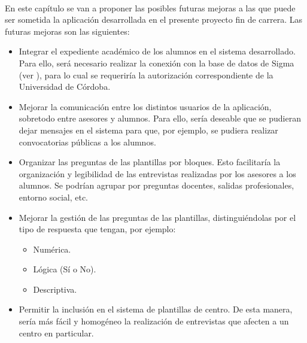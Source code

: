 \paragraph{}En este capítulo se van a proponer las posibles futuras mejoras
a las que puede ser sometida la aplicación desarrollada en el presente
proyecto fin de carrera. Las futuras mejoras son las siguientes:

\begin{itemize}
  \item Integrar el expediente académico de los alumnos en el sistema
  desarrollado. Para ello, será necesario realizar la conexión con la base de
  datos de Sigma (ver \cite{sigma}), para lo cual se requeriría la autorización
  correspondiente de la Universidad de Córdoba.
  \item Mejorar la comunicación entre los distintos usuarios de la aplicación,
  sobretodo entre asesores y alumnos. Para ello, sería deseable que se pudieran
  dejar mensajes en el sistema para que, por ejemplo, se pudiera realizar
  convocatorias públicas a los alumnos.
  \item Organizar las preguntas de las plantillas por bloques. Esto facilitaría
  la organización y legibilidad de las entrevistas realizadas por los asesores
  a los alumnos. Se podrían agrupar por preguntas docentes, salidas
  profesionales, entorno social, etc.
  \item Mejorar la gestión de las preguntas de las plantillas, distinguiéndolas
  por el tipo de respuesta que tengan, por ejemplo:
  \begin{itemize}
    \item Numérica.
    \item Lógica (Sí o No).
    \item Descriptiva.
  \end{itemize}
  \item Permitir la inclusión en el sistema de plantillas de centro. De esta
  manera, sería más fácil y homogéneo la realización de entrevistas que afecten
  a un centro en particular.
\end{itemize}


